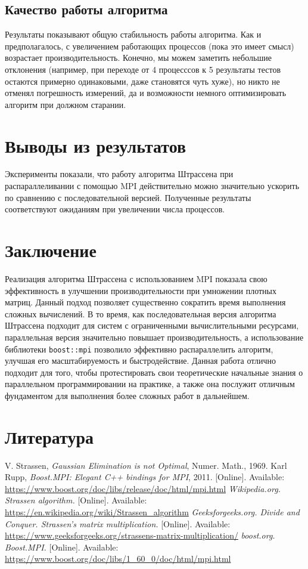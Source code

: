 \documentclass[a4paper,12pt]{article}
\begin{document}
\subsection{Качество работы алгоритма}
Результаты показывают общую стабильность работы алгоритма. Как и предполагалось, с увеличением работающих процессов (пока это имеет смысл) возрастает производительность. Конечно, мы можем заметить небольшие отклонения (например, при переходе от 4 процесссов к 5 результаты тестов остаются примерно одинаковыми, даже становятся чуть хуже), но никто не отменял погрешность измерений, да и возможности немного оптимизировать алгоритм при должном старании. 

\section{Выводы из результатов}
Эксперименты показали, что работу алгоритма Штрассена при распараллеливании с помощью MPI действительно можно значительно ускорить по сравнению с последовательной версией. Полученные результаты соответствуют ожиданиям при увеличении числа процессов.

\section{Заключение}
Реализация алгоритма Штрассена с использованием MPI показала свою эффективность в улучшении производительности при умножении плотных матриц. Данный подход позволяет существенно сократить время выполнения сложных вычислений. В то время, как последовательная версия алгоритма Штрассена подходит для систем с ограниченными вычислительными ресурсами, параллельная версия значительно повышает производительность, а использование библиотеки \texttt{boost::mpi} позволило эффективно распараллелить алгоритм, улучшая его масштабируемость и быстродействие. Данная работа отлично подходит для того, чтобы протестировать свои теоретические начальные знания о параллельном программировании на практике, а также она послужит отличным фундаментом для выполнения более сложных работ в дальнейшем.

\section{Литература}
\begin{thebibliography}{9}
     V. Strassen, \textit{Gaussian Elimination is not Optimal}, Numer. Math., 1969.
     Karl Rupp, \textit{Boost.MPI: Elegant C++ bindings for MPI}, 2011. [Online]. Available: \url{https://www.boost.org/doc/libs/release/doc/html/mpi.html}
    \textit{Wikipedia.org. Strassen algorithm.} [Online]. Available: \url{https://en.wikipedia.org/wiki/Strassen_algorithm}
    \textit{Geeksforgeeks.org. Divide and Conquer. Strassen's matrix multiplication.} [Online]. Available: \url{https://www.geeksforgeeks.org/strassens-matrix-multiplication/}
    \textit{boost.org. Boost.MPI.} [Online]. Available: \url{https://www.boost.org/doc/libs/1_60_0/doc/html/mpi.html}
  \end{thebibliography}
\end{document}
